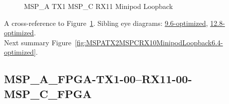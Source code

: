 \begin{figure}[h]
\begin{subfigure}{0.33\textwidth}
\hyperref[sec:MSPAFPGATX106RX1106MSPCFPGA6.4-optimized]{}
\end{subfigure}\hspace*{\fill}
\begin{subfigure}{0.33\textwidth}
\hyperref[sec:MSPAFPGATX107RX1107MSPCFPGA6.4-optimized]{}
\end{subfigure}\hspace*{\fill}
\begin{subfigure}{0.33\textwidth}
\hyperref[sec:MSPAFPGATX108RX1108MSPCFPGA6.4-optimized]{}
\end{subfigure}

\begin{subfigure}{0.33\textwidth}
\hyperref[sec:MSPAFPGATX109RX1109MSPCFPGA6.4-optimized]{}
\end{subfigure}\hspace*{\fill}
\begin{subfigure}{0.33\textwidth}
\hyperref[sec:MSPAFPGATX110RX1110MSPCFPGA6.4-optimized]{}
\end{subfigure}\hspace*{\fill}
\begin{subfigure}{0.33\textwidth}
\hyperref[sec:MSPAFPGATX111RX1111MSPCFPGA6.4-optimized]{}
\end{subfigure}

\caption{MSP\_A TX1 MSP\_C RX11 Minipod Loopback} \label{fig:MSPATX1MSPCRX11MinipodLoopback6.4-optimized}
\end{figure}

A cross-reference to Figure~\ref{fig:MSPATX1MSPCRX11MinipodLoopback6.4-optimized}.
Sibling eye diagrams: \hyperref[sec:MSPATX1MSPCRX11MinipodLoopback9.6-optimized]{9.6-optimized}, \hyperref[sec:MSPATX1MSPCRX11MinipodLoopback12.8-optimized]{12.8-optimized}. \\
Next summary Figure~\ref{fig:MSPATX2MSPCRX10MinipodLoopback6.4-optimized}.
\clearpage
% 
\subsection{MSP\_A\_FPGA-TX1-00--RX11-00-MSP\_C\_FPGA}\label{sec:MSPAFPGATX100RX1100MSPCFPGA6.4-optimized}

